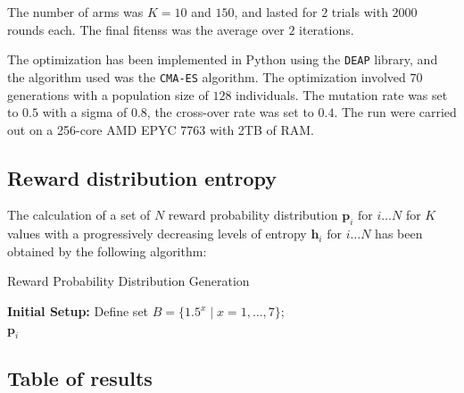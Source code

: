 \noindent The number of arms was $K=10$ and $150$, and lasted for $2$ trials with $2000$ rounds each.
The final fitenss was the average over $2$ iterations.

\hfill \break
The optimization has been implemented in Python using the \texttt{DEAP} library, and the algorithm used was the \texttt{CMA-ES} algorithm. The optimization involved $70$ generations with a population size of $128$ individuals. The mutation rate was set to $0.5$ with a sigma of $0.8$, the cross-over rate was set to $0.4$.
The run were carried out on a 256-core AMD EPYC 7763 with 2TB of RAM.


\subsection{Reward distribution entropy}\label{sec:appendix_entropy}

\noindent The calculation of a set of $N$ reward probability distribution $\mathbf{p}_{i}\text{  for  } i\ldots N$ for $K$ values with a progressively decreasing levels of entropy $\mathbf{h}_{i}\text{  for  } i\ldots N$ has been obtained by the following algorithm:

\begin{algorithm}[ht]
\caption{Reward Probability Distribution Generation}
\label{alg:reward_distribution}
\SetAlgoLined
{}
\textbf{Initial Setup:}
Define set $B = \{1.5^x \mid x = 1, \ldots, 7\}$; \\
\Return ${\mathbf{p}_i}$
\end{algorithm}


\subsection{Table of results}

